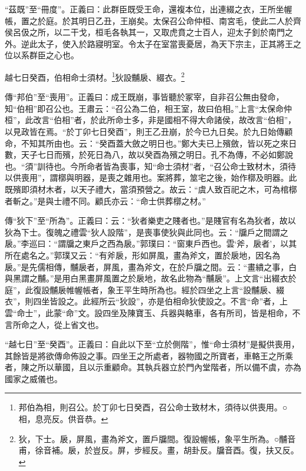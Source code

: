 {\noindent\shu{}\fzkt “茲既”至“冊度”。正義曰：此群臣既受王命，還複本位，出連綴之衣，王所坐幄帳，置之於庭。於其明日乙丑，王崩矣。太保召公命仲桓、南宮毛，使此二人於齊侯呂伋之所，以二干戈，桓毛各執其一，又取虎賁之士百人，迎太子釗於南門之外。逆此太子，使入於路寢明室。令太子在室當喪憂居，為天下宗主，正其將王之位以系群臣之心也。 \par}

越七日癸酉，伯相命士須材。\footnote{邦伯為相，則召公。於丁卯七日癸酉，召公命士致材木，須待以供喪用。○相，息亮反。供音恭。}狄設黼扆、綴衣。\footnote{狄，下士。扆，屏風，畫為斧文，置戶牖間。復設幄帳，象平生所為。○黼音甫，徐音補。扆，於豈反。屏，步經反。畫，胡卦反。牖音酉。復，扶又反。}


{\noindent\zhuan{}\fzbyks 傳“邦伯”至“喪用”。正義曰：成王既崩，事皆聽於冢宰，自非召公無由發命，知“伯相”即召公也。王肅云：“召公為二伯，相王室，故曰伯相。”上言“太保命仲桓”，此改言“伯相”者，於此所命士多，非是國相不得大命諸侯，故改言“伯相”，以見政皆在焉。“於丁卯七日癸酉”，則王乙丑崩，於今已九日矣。於九日始傳顧命，不知其所由也。云：“癸酉蓋大斂之明日也。”鄭大夫已上殯斂，皆以死之來日數，天子七日而殯，於死日為八，故以癸酉為殯之明日。孔不為傳，不必如鄭說也。“須”訓待也。今所命者皆為喪事，知“命士須材”者，“召公命士致材木，須待以供喪用”，謂槨與明器，是喪之雜用也。案將葬，筮宅之後，始作槨及明器。此既殯即須材木者，以天子禮大，當須預營之。故云：“虞人致百祀之木，可為棺槨者斬之。”是與士禮不同。顧氏亦云：“命士供葬槨之材。” \par}

{\noindent\zhuan{}\fzbyks 傳“狄下”至“所為”。正義曰：云：“狄者樂吏之賤者也。”是賤官有名為狄者，故以狄為下士。復魄之禮雲“狄人設階”，是喪事使狄與此同也。云：“牖戶之間謂之扆。”李巡曰：“謂牖之東戶之西為扆。”郭璞曰：“窗東戶西也。雲‘斧，扆者’，以其所在處名之。”郭璞又云：“有斧扆，形如屏風，畫為斧文，置於扆地，因名為扆。”是先儒相傳，黼扆者，屏風，畫為斧文，在於戶牖之間。云：“畫繢之事，白與黑謂之黼。”是用白黑畫屏風置之於扆地，故名此物為“黼扆”。上文言“出綴衣於庭”，此復設黼扆帷幄帳者，象王平生時所為也。經於四坐之上言“設黼扆、綴衣”，則四坐皆設之。此經所云“狄設”，亦是伯相命狄使設之。不言“命”者，上雲“命士”，此蒙“命”文。設四坐及陳寶玉、兵器與輅車，各有所司，皆是相命，不言所命之人，從上省文也。 \par}

{\noindent\shu{}\fzkt “越七日”至“癸酉”。正義曰：自此以下至“立於側階”，惟“命士須材”是擬供喪用，其餘皆是將欲傳命佈設之事。四坐王之所處者，器物國之所寶者，車輅王之所乘者，陳之所以華國，且以示重顧命。其執兵器立於門內堂階者，所以備不虞，亦為國家之威儀也。 \par}

